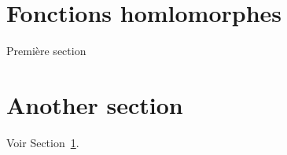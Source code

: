 \documentclass[12pt]{amsproc}%
\begin{document}
\section{Fonctions homlomorphes}\label{sec:prelim}
 Première section

\section{Another section}
Voir Section~\ref{sec:prelim}.
\end{document}
